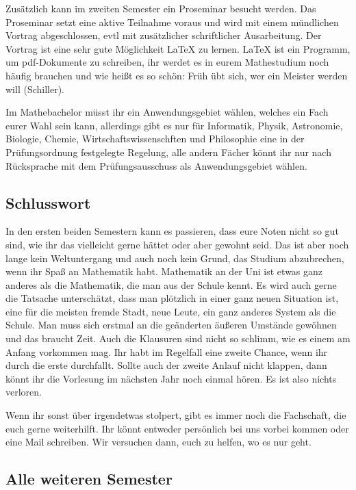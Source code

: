 Zusätzlich kann im zweiten Semester ein Proseminar besucht werden. Das
Proseminar setzt eine aktive Teilnahme voraus und wird mit einem mündlichen
Vortrag abgeschlossen, evtl mit zusätzlicher schriftlicher Ausarbeitung.  Der
Vortrag ist eine sehr gute Möglichkeit LaTeX zu lernen.  LaTeX ist ein
Programm, um pdf-Dokumente zu schreiben, ihr werdet es in eurem Mathestudium
noch häufig brauchen und wie heißt es so schön: Früh übt sich, wer ein Meister
werden will (Schiller).


Im Mathebachelor müsst ihr ein Anwendungsgebiet wählen, welches ein Fach eurer
Wahl sein kann, allerdings gibt es nur für Informatik, Physik, Astronomie,
Biologie, Chemie, Wirtschaftswissenschften und Philosophie eine in der
Prüfungsordnung festgelegte Regelung, alle andern Fächer könnt ihr nur nach
Rücksprache mit dem Prüfungsausschuss als Anwendungsgebiet wählen.

\subsection{Schlusswort}

In den ersten beiden Semestern kann es passieren, dass eure Noten nicht so gut
sind, wie ihr das vielleicht gerne hättet oder aber gewohnt seid.  Das ist aber
noch lange kein Weltuntergang und auch noch kein Grund, das Studium
abzubrechen, wenn ihr Spaß an Mathematik habt. Mathematik an der Uni ist etwas
ganz anderes als die Mathematik, die man aus der Schule kennt.  Es wird auch
gerne die Tatsache unterschätzt, dass man plötzlich in einer ganz neuen
Situation ist, eine für die meisten fremde Stadt, neue Leute, ein ganz anderes
System als die Schule.  Man muss sich erstmal an die geänderten äußeren
Umstände gewöhnen und das braucht Zeit.  Auch die Klausuren sind nicht so
schlimm, wie es einem am Anfang vorkommen mag.  Ihr habt im Regelfall eine
zweite Chance, wenn ihr durch die erste durchfallt.  Sollte auch der zweite
Anlauf nicht klappen, dann könnt ihr die Vorlesung im nächsten Jahr noch einmal
hören. Es ist also nichts verloren.

Wenn ihr sonst über irgendetwas stolpert, gibt es immer noch die Fachschaft,
die euch gerne weiterhilft. Ihr könnt entweder persönlich bei uns vorbei kommen
oder eine Mail schreiben. Wir versuchen dann, euch zu helfen, wo es nur geht.


\subsection{Alle weiteren Semester}

